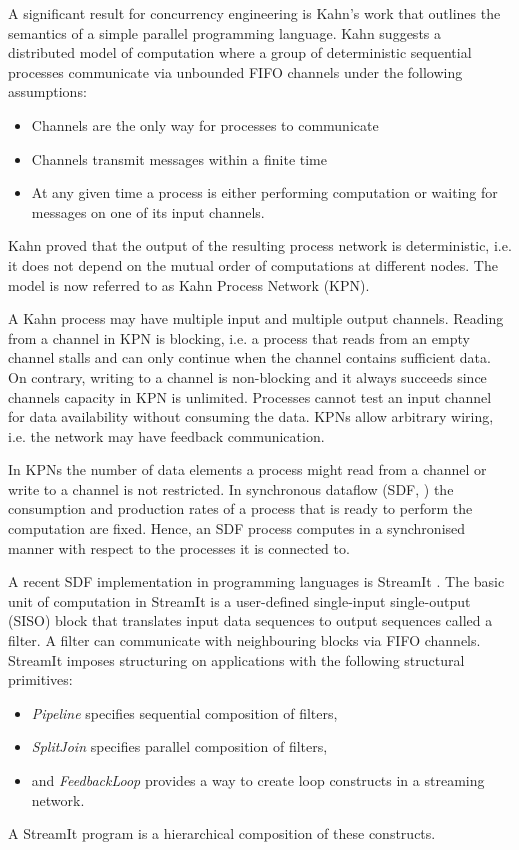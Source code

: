 A significant result for concurrency engineering is Kahn's work \cite{kahn74} that outlines the semantics of a simple parallel programming language. Kahn suggests a distributed model of computation where a group of deterministic sequential processes communicate via unbounded FIFO channels under the following assumptions:
\begin{itemize}
\item Channels are the only way for processes to communicate
\item Channels transmit messages within a finite time
\item At any given time a process is either performing computation or waiting for messages on one of its input channels.
\end{itemize}
Kahn proved that the output of the resulting process network is deterministic, i.e. it does not depend on the mutual order of computations at different nodes. The model is now referred to as Kahn Process Network (KPN).

A Kahn process may have multiple input and multiple output channels. Reading from a channel in KPN is blocking, i.e. a process that reads from an empty channel stalls and can only continue when the channel contains sufficient data.  On contrary, writing to a channel is non-blocking and it always succeeds since channels capacity in KPN is unlimited. Processes cannot test an input channel for data availability without consuming the data. KPNs allow arbitrary wiring, i.e. the network may have feedback communication.

In KPNs the number of data elements a process might read from a channel or write to a channel is not restricted. In synchronous dataflow (SDF, \cite{sdf}) the consumption and production rates of a process that is ready to perform the computation are fixed. Hence, an SDF process computes in a synchronised manner with respect to the processes it is connected to.

A recent SDF implementation in programming languages is StreamIt \cite{streamit}. The basic unit of computation in StreamIt is a user-defined single-input single-output (SISO) block that translates input data sequences to output sequences called a filter. A filter can communicate with neighbouring blocks via FIFO channels. StreamIt imposes structuring on applications with the following structural primitives:
\begin{itemize}
\item \emph{Pipeline} specifies sequential composition of filters,
\item \emph{SplitJoin} specifies parallel composition of filters,
\item and \emph{FeedbackLoop} provides a way to create loop constructs in a streaming network.
\end{itemize}
A StreamIt program is a hierarchical composition of these constructs.

